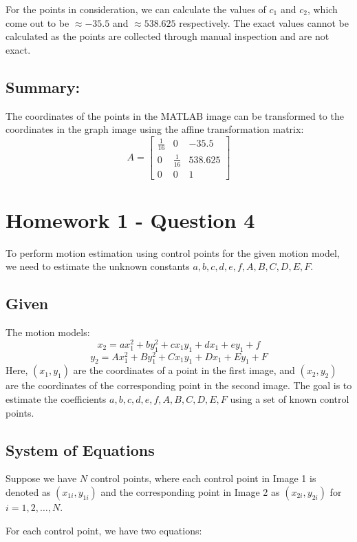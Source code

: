\documentclass{article}
\begin{document}
For the points in consideration, we can calculate the values of $c_1$ and $c_2$, which come out to be $\approx-35.5$ and $\approx538.625$ respectively. The exact values cannot be calculated as the points are collected through manual inspection and are not exact.

\subsection*{Summary:} 
The coordinates of the points in the MATLAB image can be transformed to the coordinates in the graph image using the affine transformation matrix:
\begin{equation*}
A = \begin{bmatrix}
\frac{1}{16} & 0 & -35.5 \\
0 & \frac{1}{16} & 538.625 \\
0 & 0 & 1
\end{bmatrix}
\end{equation*}

\newpage
\section{Homework 1 - Question 4}

To perform motion estimation using control points for the given motion model, we need to estimate the unknown constants \(a, b, c, d, e, f, A, B, C, D, E, F\).

\subsection*{Given}
The motion models:
\[
x_2 = ax_1^2 + by_1^2 + cx_1y_1 + dx_1 + ey_1 + f
\]
\[
y_2 = Ax_1^2 + By_1^2 + Cx_1y_1 + Dx_1 + Ey_1 + F
\]
Here, \( (x_1, y_1) \) are the coordinates of a point in the first image, and \( (x_2, y_2) \) are the coordinates of the corresponding point in the second image. The goal is to estimate the coefficients \( a, b, c, d, e, f, A, B, C, D, E, F \) using a set of known control points.

\subsection*{System of Equations}
Suppose we have \(N\) control points, where each control point in Image 1 is denoted as \( (x_{1i}, y_{1i}) \) and the corresponding point in Image 2 as \( (x_{2i}, y_{2i}) \) for \( i = 1, 2, \ldots, N \).

For each control point, we have two equations:
\end{document}
